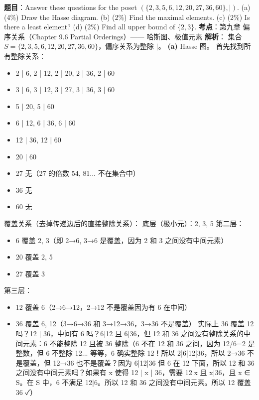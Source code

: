 \documentclass[10pt,a4paper,openany]{ctexbook}
\theoremstyle{definition}
\theoremstyle{remark}
\begin{document}
\textbf{题目}：Answer these questions for the poset $(\{2,3,5,6,12,20,27,36,60\}, |)$.
(a) (4\%) Draw the Hasse diagram.
(b) (2\%) Find the maximal elements.
(c) (2\%) Is there a least element?
(d) (2\%) Find all upper bound of $\{2,3\}$.
\textbf{考点}：第九章 偏序关系（Chapter 9.6 Partial Orderings）—— 哈斯图、极值元素
\textbf{解析}：
集合 $S = \{2, 3, 5, 6, 12, 20, 27, 36, 60\}$，偏序关系为整除 $|$。
\textbf{(a)} Hasse 图。
首先找到所有整除关系：
\begin{itemize}
\item 2 | 6, 2 | 12, 2 | 20, 2 | 36, 2 | 60
\item 3 | 6, 3 | 12, 3 | 27, 3 | 36, 3 | 60
\item 5 | 20, 5 | 60
\item 6 | 12, 6 | 36, 6 | 60
\item 12 | 36, 12 | 60
\item 20 | 60
\item 27 无（27 的倍数 54, 81... 不在集合中）
\item 36 无
\item 60 无

\end{itemize}

覆盖关系（去掉传递边后的直接整除关系）：
底层（极小元）：2, 3, 5
第二层：
\begin{itemize}
\item 6 覆盖 2, 3（即 2→6, 3→6 是覆盖，因为 2 和 3 之间没有中间元素）
\item 20 覆盖 2, 5
\item 27 覆盖 3

\end{itemize}

第三层：
\begin{itemize}
\item 12 覆盖 6（2→6→12，2→12 不是覆盖因为有 6 在中间）
\item 36 覆盖 6, 12（3→6→36 和 3→12→36，3→36 不是覆盖）
实际上 36 覆盖 12 吗？12 | 36，中间有 6 吗？6|12 且 6|36，但 12 和 36 之间没有整除关系的中间元素：6 不能整除 12 且被 36 整除（6 不在 12 和 36 之间，因为 12/6=2 是整数，但 6 不整除 12... 等等，6 确实整除 12！所以 2|6|12|36，所以 2→36 不是覆盖，但 12→36 也不是覆盖？因为 6|12|36 但 6 在 12 下面，所以 12 和 36 之间没有中间元素吗？如果有 x 使得 12 | x | 36，需要 12|x 且 x|36，且 x ∈ S。在 S 中，6 不满足 12|6。所以 12 和 36 之间没有中间元素。所以 12 覆盖 36 ✓）


\end{itemize}
\end{document}
